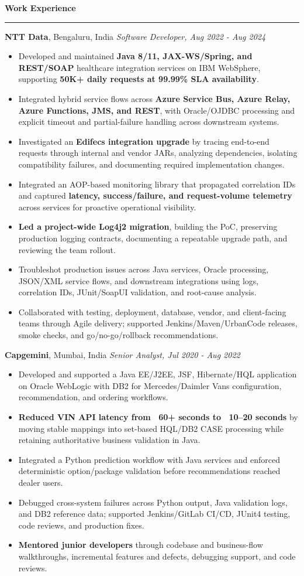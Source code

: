 \documentclass[11pt,letterpaper]{article}
\newcommand{\ressection}[1]{\Needspace{5\baselineskip}\vspace{8pt}\par\textbf{#1}\par\vspace{2pt}\hrule\vspace{5pt}}
\begin{document}
\ressection{Work Experience}
\textbf{NTT Data}, Bengaluru, India \hfill \textit{Software Developer, Aug 2022 - Aug 2024}
\begin{itemize}
  \item Developed and maintained \textbf{Java 8/11, JAX-WS/Spring, and REST/SOAP} healthcare integration services on IBM WebSphere, supporting \textbf{50K+ daily requests at 99.99\% SLA availability}.
  \item Integrated hybrid service flows across \textbf{Azure Service Bus, Azure Relay, Azure Functions, JMS, and REST}, with Oracle/OJDBC processing and explicit timeout and partial-failure handling across downstream systems.
  \item Investigated an \textbf{Edifecs integration upgrade} by tracing end-to-end requests through internal and vendor JARs, analyzing dependencies, isolating compatibility failures, and documenting required implementation changes.
  \item Integrated an AOP-based monitoring library that propagated correlation IDs and captured \textbf{latency, success/failure, and request-volume telemetry} across services for proactive operational visibility.
  \item \textbf{Led a project-wide Log4j2 migration}, building the PoC, preserving production logging contracts, documenting a repeatable upgrade path, and reviewing the team rollout.
  \item Troubleshot production issues across Java services, Oracle processing, JSON/XML service flows, and downstream integrations using logs, correlation IDs, JUnit/SoapUI validation, and root-cause analysis.
  \item Collaborated with testing, deployment, database, vendor, and client-facing teams through Agile delivery; supported Jenkins/Maven/UrbanCode releases, smoke checks, and go/no-go/rollback recommendations.
\end{itemize}
\textbf{Capgemini}, Mumbai, India \hfill \textit{Senior Analyst, Jul 2020 - Aug 2022}
\begin{itemize}
  \item Developed and supported a Java EE/J2EE, JSF, Hibernate/HQL application on Oracle WebLogic with DB2 for Mercedes/Daimler Vans configuration, recommendation, and ordering workflows.
  \item \textbf{Reduced VIN API latency from ~60+ seconds to ~10--20 seconds} by moving stable mappings into set-based HQL/DB2 CASE processing while retaining authoritative business validation in Java.
  \item Integrated a Python prediction workflow with Java services and enforced deterministic option/package validation before recommendations reached dealer users.
  \item Debugged cross-system failures across Python output, Java validation logs, and DB2 reference data; supported Jenkins/GitLab CI/CD, JUnit4 testing, code reviews, and production fixes.
  \item \textbf{Mentored junior developers} through codebase and business-flow walkthroughs, incremental features and defects, debugging support, and code reviews.
\end{itemize}
\end{document}
